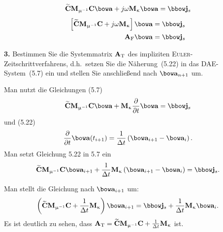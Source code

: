 \documentclass[Protokollheft.tex]{subfiles}
\begin{document}
$$ \curldfit\Mmui\curlfit\afit + j \omega\Mkap\afit = \jfit_{\boldmath{s}} $$
\begin{eqnarray}
\left[ \curldfit\Mmui\curlfit + j \omega\Mkap \right]\afit = \jfit_{\boldmath{s}} \\
\Amat_\text{F}\afit=\jfit_{\boldmath{s}}
 \end{eqnarray}
\begin{framed}
	\noindent \textbf{3.} Bestimmen Sie die Systemmatrix $ \mathbf{A} _\text{T}$ des impliziten
      \textsc{Euler}-Zeitschrittverfahrens, d.h.\ setzen Sie die Näherung~(5.22) in das DAE-System~(5.7) ein und stellen Sie anschließend nach $\afit_{n+1}$ um.\label{exer:systemMatMQST}
\end{framed}
Man nutzt die Gleichungen (5.7)
$$ \curldfit\Mmui\curlfit\afit +           \Mkap      \frac{\partial }{\partial t}\afit = \jfit_{\boldmath{s}} $$
und (5.22)
$$ \frac{\partial }{\partial t}\afit(t_{i+1})=\frac{1}{\Delta t}\left(\afit_{i+1} - \afit_i\right).$$
Man setzt  Gleichung 5.22 in 5.7 ein
$$ \curldfit\Mmui\curlfit\afit_{i+1}+\frac{1}{\Delta t}\Mkap\left(\afit_{i+1} - \afit_i\right)= \jfit_{\boldmath{s}}. $$

Man stellt die Gleichung nach $\afit_{i+1}$ um:
$$ \left(\curldfit\Mmui\curlfit+\frac{1}{\Delta t}\Mkap\right)\afit_{i+1}= \jfit_{\boldmath{s}}+\frac{1}{\Delta t}\Mkap\afit_i. $$
Es ist deutlich zu sehen, dass $ \mathbf{A} _\text{T} =\widetilde{\mathbf{C}}\mathbf{M}_{\upmu^{-1}}\mathbf{C}+\frac{1}{\Delta t}\mathbf{M}_{\upkappa} $ ist.
\end{document}
